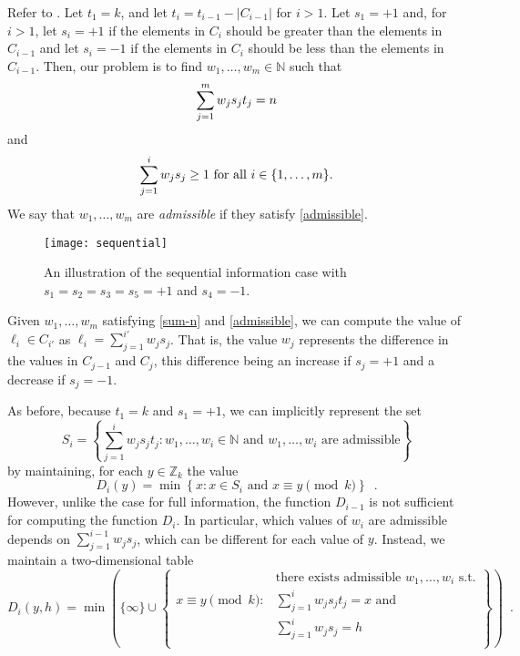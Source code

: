 \documentclass[11pt]{patmorin}
\newcommand{\Z}{\mathbb{Z}}
\newcommand{\N}{\mathbb{N}}
\begin{document}
Refer to .
Let $t_1=k$, and let $t_i = t_{i-1}-|C_{i-1}|$ for $i>1$.  Let
$s_1=+1$ and, for $i>1$, let $s_i=+1$ if the elements in $C_{i}$
should be greater than the elements in $C_{i-1}$ and let $s_{i}=-1$ if
the elements in $C_{i}$ should be less than the elements in $C_{i-1}$.
Then, our problem is to find $w_1,\ldots,w_m\in\N$ such
that
\begin{equation}
\sum_{j=1}^m w_js_jt_j = n \eqlabel{sum-n}
\end{equation}
and
\begin{equation}
\sum_{j=1}^i w_js_j \ge 1 \mbox{ for all $i\in\{1,\ldots,m\}$.}
\eqlabel{admissible}
\end{equation}
We say that $w_1,\ldots,w_m$ are \emph{admissible} if they satisfy
\eqref{admissible}.


\begin{figure}
\begin{center}\texttt{[image: sequential]}\end{center}
\caption{An illustration of the sequential information case with
$s_1=s_2=s_3=s_5 = +1$ and $s_4=-1$.}
\end{figure}

Given $w_1,\ldots,w_m$ satisfying \eqref{sum-n} and
\eqref{admissible}, we can compute the value of $\ell_i\in C_{i'}$ as 
$\ell_i =\sum_{j=1}^{i'} w_js_j$.  That is, the value $w_j$ represents the
difference in the values in $C_{j-1}$ and $C_j$, this difference being
an increase if $s_j=+1$ and a decrease if $s_j=-1$.

As before, because $t_1=k$ and $s_1=+1$, we can implicitly represent
the set 
\[
   S_i = \left\{\sum_{j=1}^i w_js_jt_j : 
	\mbox{$w_1,\ldots,w_i\in\mathbb{N}$ and  
		$w_1,\ldots,w_i$ are admissible} \right\}
\]
by maintaining, for each $y\in \Z_k$ the value 
\[
   D_i(y) = \min\left\{x : \mbox{$x\in S_i$ and $x\equiv y\pmod{k}$} \right\}
    \enspace .
\]
However, unlike the case for full information, the function $D_{i-1}$
is not sufficient for computing the function $D_{i}$.  In particular,
which values of $w_i$ are admissible depends on
$\sum_{j=1}^{i-1}w_js_j$, which can be different for each value of $y$.
Instead, we maintain a two-dimensional table
\[
   D_i(y,h) = \min\left(\{\infty\}\cup \left\{
    \begin{array}{ll}
          & \mbox{there exists admissible $w_1,\ldots,w_i$ s.t.} \\
        \mbox{$x\equiv y\pmod{k}$} : & \mbox{$\sum_{j=1}^i w_js_jt_j = x$ and} \\
          & \mbox{$\sum_{j=1}^i w_js_j = h$} \\
          
    \end{array}
    \right\}\right)
    \enspace .
\]
\end{document}
